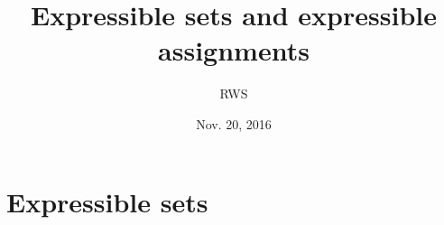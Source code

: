 \documentclass[aps,english,superscriptaddress,onecolumn,twoside,longbibliography,pra,floatfix,fleqn,notitlepage,nofootinbib]{revtex4-1}
\theoremstyle{definition}
\begin{document}
\title{Expressible sets and expressible assignments}
\author{RWS}
\date{Nov. 20, 2016}                                           %
\maketitle


\section{Expressible sets}
\end{document}
